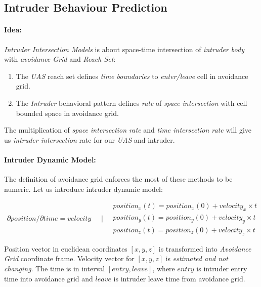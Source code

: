 \newpage
\subsection{Intruder Behaviour Prediction}\label{s:intruderBehaviourPrediction}
\paragraph{Idea:} \emph{Intruder Intersection Models} is about space-time intersection of \emph{intruder body} with \emph{avoidance Grid} and \emph{Reach Set}:
\begin{enumerate}
    \item The \emph{UAS} reach set defines \emph{time boundaries} to \emph{enter/leave} cell in avoidance grid.
    \item The \emph{Intruder} behavioral pattern defines \emph{rate} of \emph{space intersection} with cell bounded space in avoidance grid.
\end{enumerate}

The multiplication of \emph{space intersection rate} and \emph{time intersection rate} will give us \emph{intruder intersection} rate for our \emph{UAS} and intruder.


\paragraph{Intruder Dynamic Model:} The  definition of avoidance grid enforces the  most of these methods to be numeric. Let us introduce intruder dynamic model:

\begin{equation}\label{eq:intruderBasicLinearModel}
    \begin{aligned}
        \partial position /\partial time = velocity 
    \end{aligned}
    \quad | \quad
    \begin{aligned}
        position_x(t) = position_x(0) + velocity_x \times t\\
        position_y(t) = position_y(0) + velocity_y \times t\\
        position_z(t) = position_z(0) + velocity_z \times t
    \end{aligned}
\end{equation}

\noindent Position vector in euclidean coordinates $[x,y,z]$   is transformed into \emph{Avoidance Grid} coordinate frame. Velocity vector for $[x,y,z]$  is \emph{estimated and not changing}. The time  is in interval $[entry,leave]$, where $entry$ is intruder entry time into avoidance grid and $leave$ is intruder leave time from avoidance grid. 

